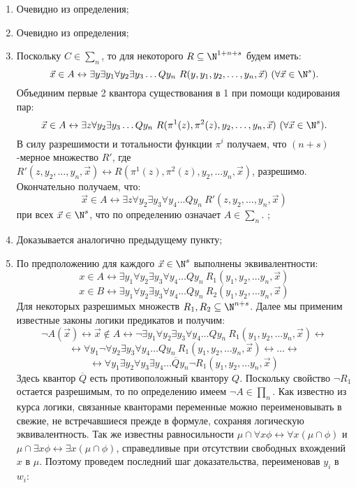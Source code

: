 \documentclass[a4paper, 10pt]{article}
\begin{document}
\begin{enumerate}
	\item{Очевидно из определения};
	\item{Очевидно из определения};
	\item{Поскольку $C \in \sum_n$, то для некоторого $R \subseteq \N^{1 + n + s}$ будем иметь:
		$$\vec{x} \in A \leftrightarrow \exists y \exists y_1 \forall y_2 \exists y_3 \ldots Q y_n \ R(y, y_1, y_2, \ldots, y_n, \vec{x}) \ (\forall \vec{x} \in \N^s).$$
		Объединим первые 2 квантора существования в 1 при помощи кодирования пар:
		$$\vec{x} \in A \leftrightarrow \exists z \forall y_2 \exists y_3 \ldots Q y_n \ R(\pi^{1}(z), \pi^{2}(z), y_2, \ldots, y_n, \vec{x}) \ (\forall \vec{x} \in \N^s).$$
		В силу разрешимости и тотальности функции $\pi^{i}$ получаем, что $(n+s)$-мерное множество $R'$, где $R'(z, y_2, \ldots, y_n, \vec{x}) \leftrightarrow R(\pi^{1}(z), \pi^{2}(z), y_2, \ldots y_n, \vec{x})$, разрешимо. Окончательно получаем, что:
		$$\vec{x} \in A \leftrightarrow \exists z \forall y_2 \exists y_3 \forall y_4 \ldots Q y_n \ R'(z, y_2, \ldots, y_n, \vec{x})$$
		при всех $\vec{x} \in \N^s$, что по определению означает $A \in \sum_n$.
	};
	\item{Доказывается аналогично предыдущему пункту};
	\item{По предположению для каждого $\vec{x} \in \N^s$ выполнены эквивалентности:
		$$x \in A \leftrightarrow \exists y_1 \forall y_2 \exists y_3 \forall y_4 \ldots Q y_n \ R_1(y_1, y_2, \ldots y_n, \vec{x})$$
		$$x \in B \leftrightarrow \exists y_1 \forall y_2 \exists y_3 \forall y_4 \ldots Q y_n \ R_2(y_1, y_2, \ldots y_n, \vec{x})$$
		Для некоторых разрешимых множеств $R_1, R_2 \subseteq \N^{n+s}$. Далее мы применим известные законы логики предикатов и получим:
		$$\lnot A(\vec{x}) \leftrightarrow \vec{x} \notin A \leftrightarrow \lnot \exists y_1 \forall y_2 \exists y_3 \forall y_4 \ldots Q y_n \ R_1(y_1, y_2, \ldots y_n, \vec{x}) \leftrightarrow$$
		$$\leftrightarrow \forall y_1 \lnot \forall y_2 \exists y_3 \forall y_4 \ldots Q y_n \ R_1(y_1, y_2, \ldots y_n, \vec{x}) \leftrightarrow \ldots \leftrightarrow$$
		$$\leftrightarrow \forall y_1 \exists y_2 \forall y_3 \exists y_4 \ldots \overline{Q} y_n \lnot R_1(y_1, y_2, \ldots y_n, \vec{x})$$
		Здесь квантор $\overline{Q}$ есть противоположный квантору $Q$. Поскольку свойство $\lnot R_1$ остается разрешимым, то по определению имеем $\lnot A \in \prod_n$. Как известно из курса логики, связанные кванторами переменные можно переименовывать в свежие, не встречавшиеся прежде в формуле, сохраняя логическую эквивалентность. Так же известны равносильности $\mu \cap \forall x \phi \leftrightarrow \forall x (\mu \cap \phi)$ и $\mu \cap \exists x \phi \leftrightarrow \exists x (\mu \cap \phi)$, справедливые при отсутствии свободных вхождений $x$ в $\mu$. Поэтому проведем последний шаг доказательства, переименовав $y_i$ в $w_i$:
		
}
\end{enumerate}
\end{document}
